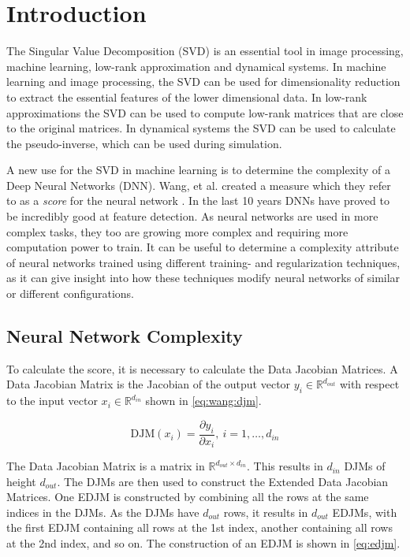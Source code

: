 
\chapter {Introduction}

The Singular Value Decomposition (SVD) is an essential tool in image processing, machine learning, low-rank approximation and dynamical systems. In machine learning and image processing, the SVD can be used for dimensionality reduction to extract the essential features of the lower dimensional data. In low-rank approximations the SVD can be used to compute low-rank matrices that are close to the original matrices. In dynamical systems the SVD can be used to calculate the pseudo-inverse, which can be used during simulation.

A new use for the SVD in machine learning is to determine the complexity of a Deep Neural Networks (DNN). Wang, et al. created a measure which they refer to as a \textit{score} for the neural network \cite{icml16:wang:edjm}. In the last 10 years DNNs have proved to be incredibly good at feature detection. As neural networks are used in more complex tasks, they too are growing more complex and requiring more computation power to train. It can be useful to determine a complexity attribute of neural networks trained using different training- and regularization techniques, as it can give insight into how these techniques modify neural networks of similar or different configurations.

\section{Neural Network Complexity}

 To calculate the score, it is necessary to calculate the Data Jacobian Matrices. A Data Jacobian Matrix is the Jacobian of the output vector $y_i \in \mathbb{R}^{d_{out}}$ with respect to the input vector $x_i \in \mathbb{R}^{d_{in}}$ shown in \eqref{eq:wang:djm}.

\begin{equation} \label{eq:wang:djm}
    \mathrm{DJM}(x_i) = \frac{\partial y_i}{\partial x_i},\ i=1, \dots, d_{in}
\end{equation}

The Data Jacobian Matrix is a matrix in $\mathbb{R}^{d_{out} \times d_{in}}$. This results in $d_{in}$ DJMs of height $d_{out}$. The DJMs are then used to construct the Extended Data Jacobian Matrices. One EDJM is constructed by combining all the rows at the same indices in the DJMs. As the DJMs have $d_{out}$ rows, it results in $d_{out}$ EDJMs, with the first EDJM containing all rows at the 1st index, another containing all rows at the 2nd index, and so on. The construction of an EDJM is shown in \eqref{eq:edjm}.

